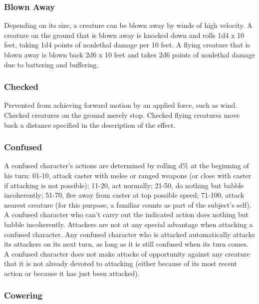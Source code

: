 \subsubsection{Blown Away}

Depending on its size, a creature can be blown away by winds 
of high velocity. A creature on the ground that is blown away is knocked down and 
rolls 1d4 x 10 feet, taking 1d4 points of nonlethal damage per 10 feet. A flying 
creature that is blown away is blown back 2d6 x 10 feet and takes 2d6 points of 
nonlethal damage due to battering and buffering. 

\subsubsection{Checked}

Prevented from achieving forward motion by an applied force, 
such as wind. Checked creatures on the ground merely stop. Checked flying creatures 
move back a distance specified in the description of the effect.

\subsubsection{Confused}

A confused character's actions are 
determined by rolling d\% at the beginning of his turn: 01-10, attack caster with 
melee or ranged weapons (or close with caster if attacking is not possible); 11-20, 
act normally; 21-50, do nothing but babble incoherently; 51-70, flee away from 
caster at top possible speed; 71-100, attack nearest creature (for this purpose, 
a familiar counts as part of the subject's self). A confused character 
who can't carry out the indicated action does nothing but babble incoherently. 
Attackers are not at any special advantage when attacking a confused character. 
Any confused character who is attacked automatically attacks its attackers 
on its next turn, as long as it is still confused when its turn comes. 
A confused character does not make attacks of opportunity against any 
creature that it is not already devoted to attacking (either because of its most 
recent action or because it has just been attacked).

\subsubsection{Cowering}

